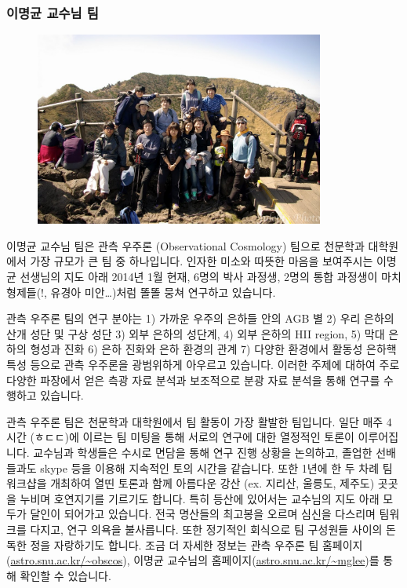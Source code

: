 \subsubsection{이명균 교수님 팀}
\begin{figure}
\begin{center}
\includegraphics[width=0.85\textwidth]{./Figures/team-lee.jpg}
\end{center}
\end{figure}
이명균 교수님 팀은 관측 우주론 (Observational Cosmology) 팀으로 천문학과 대학원에서 가장 규모가 큰 팀 중 하나입니다. 인자한 미소와 따뜻한 마음을 보여주시는 이명균 선생님의 지도 아래 2014년 1월 현재,  6명의 박사 과정생, 2명의 통합 과정생이 마치 형제들(!, 유경아 미안…)처럼 똘똘 뭉쳐 연구하고 있습니다.

관측 우주론 팀의 연구 분야는 1) 가까운 우주의 은하들 안의 AGB 별 2) 우리 은하의 산개 성단 및 구상 성단 3) 외부 은하의 성단계, 4) 외부 은하의 HII region, 5) 막대 은하의 형성과 진화 6) 은하 진화와 은하 환경의 관계 7) 다양한 환경에서 활동성 은하핵 특성 등으로 관측 우주론을 광범위하게 아우르고 있습니다. 이러한 주제에 대하여 주로 다양한 파장에서 얻은 측광 자료 분석과 보조적으로 분광 자료 분석을 통해 연구를 수행하고 있습니다.

관측 우주론 팀은 천문학과 대학원에서 팀 활동이 가장 활발한 팀입니다. 일단 매주 4시간 (ㅎㄷㄷ)에 이르는 팀 미팅을 통해 서로의 연구에 대한 열정적인 토론이 이루어집니다. 교수님과 학생들은 수시로 면담을 통해 연구 진행 상황을 논의하고, 졸업한 선배들과도 skype 등을 이용해 지속적인 토의 시간을 같습니다. 또한 1년에 한 두 차례 팀 워크샵을 개최하여 열띤 토론과 함께 아름다운 강산 (ex. 지리산, 울릉도, 제주도) 곳곳을 누비며 호연지기를 기르기도 합니다. 특히 등산에 있어서는 교수님의 지도 아래 모두가 달인이 되어가고 있습니다. 전국 명산들의 최고봉을 오르며 심신을 다스리며 팀워크를 다지고, 연구 의욕을 불사릅니다. 또한 정기적인 회식으로 팀 구성원들 사이의 돈독한 정을 자랑하기도 합니다. 조금 더 자세한 정보는 관측 우주론 팀 홈페이지(\url{astro.snu.ac.kr/~obscos}), 이명균 교수님의 홈페이지(\url{astro.snu.ac.kr/~mglee})를 통해 확인할 수 있습니다.

